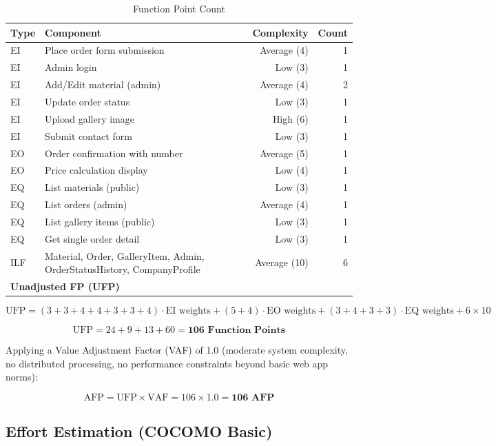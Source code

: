 \documentclass[12pt, a4paper]{article}
\begin{document}
\begin{table}[H]
\centering
\caption{Function Point Count}
\begin{tabularx}{\textwidth}{lXrr}
\toprule
\textbf{Type} & \textbf{Component} & \textbf{Complexity} & \textbf{Count} \\
\midrule
EI & Place order form submission            & Average (4) & 1 \\
EI & Admin login                            & Low (3)     & 1 \\
EI & Add/Edit material (admin)              & Average (4) & 2 \\
EI & Update order status                    & Low (3)     & 1 \\
EI & Upload gallery image                   & High (6)    & 1 \\
EI & Submit contact form                    & Low (3)     & 1 \\
EO & Order confirmation with number         & Average (5) & 1 \\
EO & Price calculation display              & Low (4)     & 1 \\
EQ & List materials (public)                & Low (3)     & 1 \\
EQ & List orders (admin)                    & Average (4) & 1 \\
EQ & List gallery items (public)            & Low (3)     & 1 \\
EQ & Get single order detail                & Low (3)     & 1 \\
ILF & Material, Order, GalleryItem, Admin, OrderStatusHistory, CompanyProfile & Average (10) & 6 \\
\midrule
\multicolumn{3}{l}{\textbf{Unadjusted FP (UFP)}} & \\
\bottomrule
\end{tabularx}
\end{table}

\[
  \text{UFP} = (3+3+4+4+3+3+4) \cdot \text{EI weights} + (5+4) \cdot \text{EO weights} + (3+4+3+3) \cdot \text{EQ weights} + 6 \times 10
\]

\[
  \text{UFP} = 24 + 9 + 13 + 60 = \textbf{106 Function Points}
\]

Applying a Value Adjustment Factor (VAF) of 1.0 (moderate system complexity, no distributed processing, no performance constraints beyond basic web app norms):

\[
  \text{AFP} = \text{UFP} \times \text{VAF} = 106 \times 1.0 = \textbf{106 AFP}
\]

\subsection{Effort Estimation (COCOMO Basic)}
\end{document}
